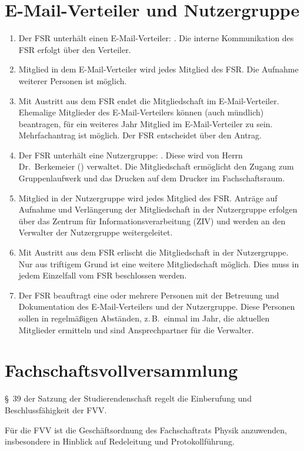 \section{E-Mail-Verteiler und Nutzergruppe}
\begin{enumerate}
	\item Der FSR unterhält einen E-Mail-Verteiler: .
	Die interne Kommunikation des FSR erfolgt über den Verteiler.
	\item Mitglied in dem E-Mail-Verteiler wird jedes Mitglied des FSR.
	Die Aufnahme weiterer Personen ist möglich.
	\item Mit Austritt aus dem FSR endet die Mitgliedschaft im E-Mail-Verteiler.
	Ehemalige Mitglieder des E-Mail-Verteilers können (auch mündlich) beantragen, für ein weiteres Jahr Mitglied im E-Mail-Verteiler zu sein.
	Mehrfachantrag ist möglich.
	Der FSR entscheidet über den Antrag.
	\item Der FSR unterhält eine Nutzergruppe: .
	Diese wird von Herrn Dr.\ Berkemeier () verwaltet.
	Die Mitgliedschaft ermöglicht den Zugang zum Gruppenlaufwerk und das Drucken auf dem Drucker im Fachschaftsraum.
	\item Mitglied in der Nutzergruppe wird jedes Mitglied des FSR.
	Anträge auf Aufnahme und Verlängerung der Mitgliedschaft in der Nutzergruppe erfolgen über das Zentrum für Informationsverarbeitung (ZIV) und werden an den Verwalter der Nutzergruppe weitergeleitet.
	\item Mit Austritt aus dem FSR erlischt die Mitgliedschaft in der Nutzergruppe.
	Nur aus triftigem Grund ist eine weitere Mitgliedschaft möglich.
	Dies muss in jedem Einzelfall vom FSR beschlossen werden.
	\item Der FSR beauftragt eine oder mehrere Personen mit der Betreuung und Dokumentation des E-Mail-Verteilers und der Nutzergruppe.
	Diese Personen sollen in regelmäßigen Abständen, z.\,B.\ einmal im Jahr, die aktuellen Mitglieder ermitteln und sind Ansprechpartner für die Verwalter.
\end{enumerate}

\section{Fachschaftsvollversammlung}
§~39 der Satzung der Studierendenschaft regelt die Einberufung und Beschlussfähigkeit der FVV.

Für die FVV ist die Geschäftsordnung des Fachschaftrats Physik anzuwenden, insbesondere in Hinblick auf Redeleitung und Protokollführung.

